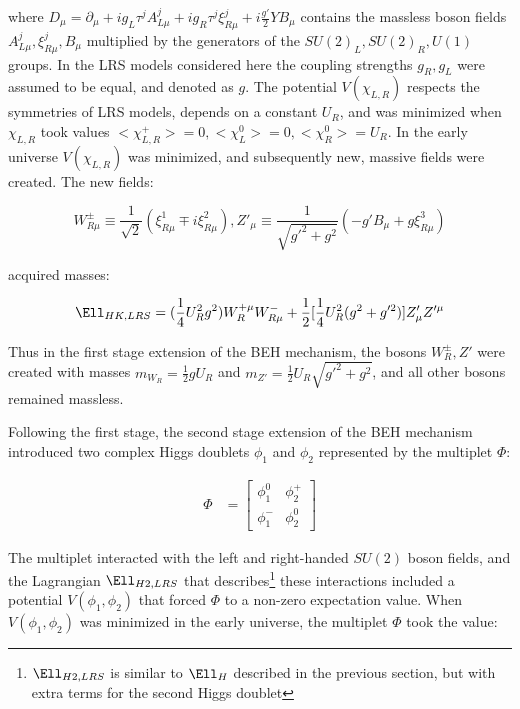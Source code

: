 where $D_{\mu} = \partial_{\mu} + ig_{L}\tau^{j}A^{j}_{L\mu} + ig_{R}\tau^{j}\xi^{j}_{R\mu} + i\frac{g'}{2}YB_{\mu}$ contains 
the massless boson fields $A^{j}_{L\mu}, \xi^{j}_{R\mu}, B_{\mu}$ multiplied by the generators of the $SU(2)_{L}, SU(2)_{R}, U(1)$ groups.  
In the LRS models considered here the coupling strengths $g_{R}, g_{L}$ were assumed to be equal, and denoted as $g$.  
The potential $V(\chi_{L,R})$ respects the symmetries of LRS models, depends on a constant $U_{R}$, and was minimized when $\chi_{L,R}$ 
took values $<\chi^{+}_{L,R}> = 0, <\chi^{0}_{L}> = 0, <\chi^{0}_{R}> = U_{R}$.  In the early universe $V(\chi_{L,R})$ was minimized, and 
subsequently new, massive fields were created.  The new fields:

\begin{equation}
	W^{\pm}_{R\mu} \equiv \frac{1}{\sqrt{2}}(\xi^{1}_{R\mu} \mp i\xi^{2}_{R\mu}), 
	Z'_{\mu} \equiv \frac{1}{\sqrt{g'^{2} + g^{2}}}(-g'B_{\mu} + g\xi^{3}_{R\mu})
\end{equation}

acquired masses:

\begin{equation}
	\Ell_{HK,LRS} = (\frac{1}{4}U^{2}_{R}g^{2})W^{+\mu}_{R}W^{-}_{R\mu} + \frac{1}{2}[\frac{1}{4}U^{2}_{R}(g^{2} + g'^{2})]Z'_{\mu}Z'^{\mu}
\end{equation}

Thus in the first stage extension of the BEH mechanism, the bosons $W^{\pm}_{R}, Z'$ were created with masses $m_{W_{R}} = \frac{1}{2}gU_{R}$ 
and $m_{Z'} = \frac{1}{2}U_{R}\sqrt{g'^{2} + g^{2}}$, and all other bosons remained massless.

Following the first stage, the second stage extension of the BEH mechanism \cite{lrsHiggsStageOne,lrsHiggsStageTwo} introduced two complex Higgs doublets 
$\phi_{1}$ and $\phi_{2}$ represented by the multiplet $\Phi$:

\begin{align}
	\Phi &= \begin{bmatrix}
	\phi^{0}_{1} & \phi^{+}_{2} \\
	\phi^{-}_{1} & \phi^{0}_{2}
	\end{bmatrix}
\end{align}

The multiplet interacted with the left and right-handed $SU(2)$ boson fields, and the Lagrangian $\Ell_{H2,LRS}$ that 
describes\footnote{$\Ell_{H2,LRS}$ is similar to $\Ell_{H}$ described in the previous section, but with extra terms for the second Higgs doublet} these 
interactions included a potential $V(\phi_{1},\phi_{2})$ that forced $\Phi$ to a non-zero expectation value.  When $V(\phi_{1},\phi_{2})$ was 
minimized in the early universe, the multiplet $\Phi$ took the value:

